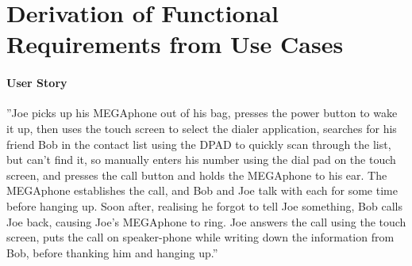 \chapter{Derivation of Functional Requirements from Use Cases} %

\label{Chapter3} %

\AddToShipoutPicture*{\UseCase}

\begin{parcolumns}[colwidths={1=.6\textwidth},rulebetween=false]{2}
\colchunk{%
}
\end{parcolumns}



        \subsubsection{User Story}
        ''Joe picks up his MEGAphone out of his bag, presses the power button to wake it up, then uses the touch screen to select the dialer application, searches for his friend Bob in the contact list using the DPAD to quickly scan through the list, but can't find it, so manually enters his number using the dial pad on the touch screen, and presses the call button and holds the MEGAphone to his ear.  The MEGAphone establishes the call, and Bob and Joe talk with each for some time before hanging up.  Soon after, realising he forgot to tell Joe something, Bob calls Joe back, causing Joe's MEGAphone to ring.  Joe answers the call using the touch screen, puts the call on speaker-phone while writing down the information from Bob, before thanking him and hanging up.''


